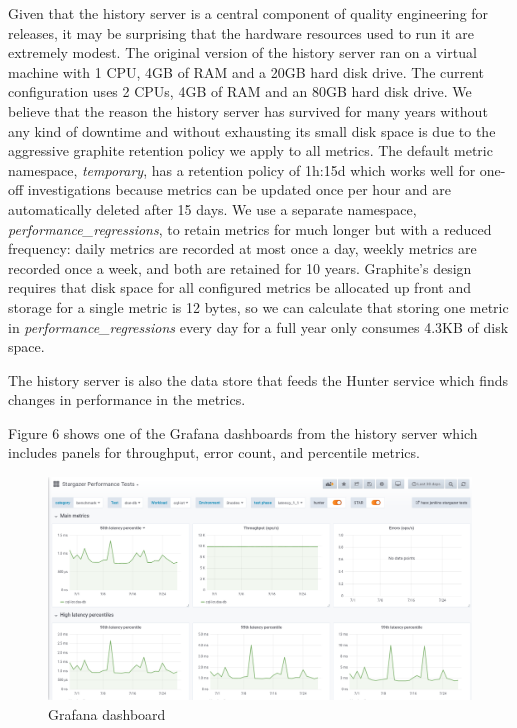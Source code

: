 \documentclass[a4paper,fleqn]{cas-dc}
\begin{document}
Given that the history server is a central component of quality engineering for releases, it may be
surprising that the hardware resources used to run it are extremely modest. The original version of
the history server ran on a virtual machine with 1 CPU, 4GB of RAM and a 20GB hard disk drive. The
current configuration uses 2 CPUs, 4GB of RAM and an 80GB hard disk drive. We believe that the
reason the history server has survived for many years without any kind of downtime and without
exhausting its small disk space is due to the aggressive graphite retention policy we apply to all
metrics. The default metric namespace, \emph{temporary}, has a retention policy of 1h:15d which
works well for one-off investigations because metrics can be updated once per hour and are
automatically deleted after 15 days. We use a separate namespace, \emph{performance\_regressions},
to retain metrics for much longer but with a reduced frequency: daily metrics are recorded at most
once a day, weekly metrics are recorded once a week, and both are retained for 10 years.
Graphite’s design requires that disk space for all configured metrics be allocated up front and
storage for a single metric is 12 bytes, so we can calculate that storing one metric in
\emph{performance\_regressions} every day for a full year only consumes 4.3KB of disk space.

The history server is also the data store that feeds the Hunter service which finds changes in
performance in the metrics.

Figure 6 shows one of the Grafana dashboards from the history server which includes panels for
throughput, error count, and percentile metrics.

\begin{figure}
	\includegraphics[width=\textwidth]{grafana}
	\caption{Grafana dashboard}\label{Figure 6}
\end{figure}
\end{document}
